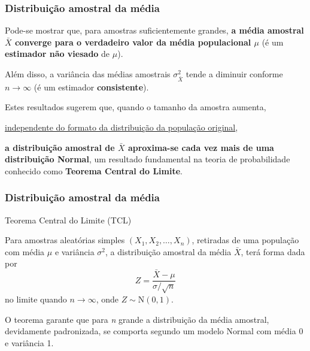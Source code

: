 \documentclass[11pt]{beamer}
\begin{document}
\begin{frame}
\frametitle{Distribuição amostral da média}

Pode-se mostrar que, para amostras suficientemente grandes, \textbf{a
média amostral \(\bar{X}\) converge para o verdadeiro valor da média
populacional \(\mu\)} (é um \textbf{estimador não viesado} de \(\mu\)).

Além disso, a variância das médias amostrais \(\sigma^2_{\bar{X}}\)
tende a diminuir conforme \(n \rightarrow \infty\) (é um estimador
\textbf{consistente}).

Estes resultados sugerem que, quando o tamanho da amostra aumenta,

\begin{center}
\underline{independente do formato da distribuição da população
original},
\end{center}

\textbf{a distribuição amostral de \(\bar{X}\) aproxima-se cada vez mais
de uma distribuição Normal}, um resultado fundamental na teoria de
probabilidade conhecido como \textbf{Teorema Central do Limite}.
\end{frame}


\begin{frame}
\frametitle{Distribuição amostral da média}

\begin{block}{Teorema Central do Limite (TCL)}

Para amostras aleatórias simples \((X_1, X_2, \ldots, X_n)\), retiradas
de uma população com média \(\mu\) e variância \(\sigma^2\), a
distribuição amostral da média \(\bar{X}\), terá forma dada por \[
Z = \frac{\bar{X} - \mu}{\sigma/\sqrt{n}}
\] no limite quando \(n \to \infty\), onde \(Z \sim \text{N}(0,1)\).

\end{block}

O teorema garante que para \textit{n} grande a distribuição da média amostral, devidamente padronizada, se comporta segundo um modelo Normal com média 0 e variância 1.

\end{frame}
\end{document}
